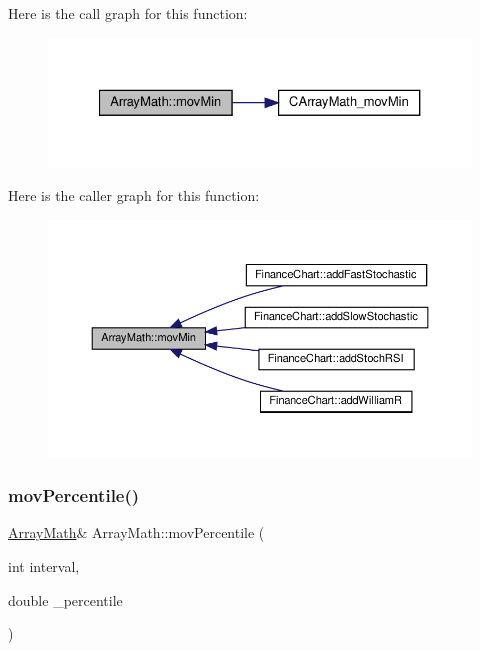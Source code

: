 Here is the call graph for this function\+:
\nopagebreak
\begin{figure}[H]
\begin{center}
\leavevmode
\includegraphics[width=327pt]{class_array_math_a42df280f64eaaad8150985d962516276_cgraph}
\end{center}
\end{figure}
Here is the caller graph for this function\+:
\nopagebreak
\begin{figure}[H]
\begin{center}
\leavevmode
\includegraphics[width=350pt]{class_array_math_a42df280f64eaaad8150985d962516276_icgraph}
\end{center}
\end{figure}
\mbox{\label{class_array_math_adc007aad3ce9cac15f02159190c2c84a}} 
\subsubsection{\texorpdfstring{mov\+Percentile()}{movPercentile()}}
{\footnotesize\ttfamily \hyperlink{class_array_math}{Array\+Math}\& Array\+Math\+::mov\+Percentile (\begin{DoxyParamCaption}\item[{int}]{interval,  }\item[{double}]{\+\_\+percentile }\end{DoxyParamCaption})\hspace{0.3cm}{\ttfamily [inline]}}



